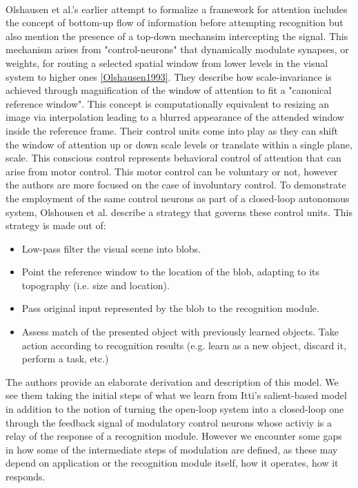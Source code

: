 \documentclass{report}
\begin{document}
\paragraph{}Olshausen et al.'s earlier attempt to formalize a framework for attention includes the concept of bottom-up flow of information before attempting recognition but also mention the presence of a top-down mechansim intercepting the signal. This mechanism arises from "control-neurons" that dynamically modulate synapses, or weights, for routing a selected spatial window from lower levels in the visual system to higher ones \cref{Olshausen1993}. They describe how scale-invariance is achieved through magnification of the window of attention to fit a "canonical reference window". This concept is computationally equivalent to resizing an image via interpolation leading to a blurred appearance of the attended window inside the reference frame. Their control units come into play as they can shift the window of attention up or down scale levels or translate within a single plane, scale. This conscious control represents behavioral control of attention that can arise from motor control. This motor control can be voluntary or not, however the authors are more focused on the case of involuntary control. To demonstrate the employment of the same control neurons as part of a closed-loop autonomous system, Olshousen et al. describe a strategy that governs these control units.
This strategy is made out of:
\begin{itemize}
  \item Low-pass filter the visual scene into blobs.
  \item Point the reference window to the location of the blob, adapting to its topography (i.e. size and location).
  \item Pass original input represented by the blob to the recognition module.
  \item Assess match of the presented object with previously learned objects. Take action according to recognition results (e.g. learn as a new object, discard it, perform a task, etc.) \cite{Olshausen1993}
\end{itemize}
The authors provide an elaborate derivation and description of this model. We see them taking the initial steps of what we learn from Itti's salient-based model in addition to the notion of turning the open-loop system into a closed-loop one through the feedback signal of modulatory control neurons whose activiy is a relay of the response of a recognition module. However we encounter some gaps in how some of the intermediate steps of modulation are defined, as these may depend on application or the recognition module itself, how it operates, how it responds. 
\end{document}
